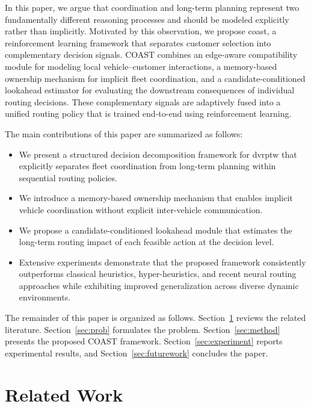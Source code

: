 \documentclass[conference]{IEEEtran}
\begin{document}
In this paper, we argue that coordination and long-term planning represent two fundamentally different reasoning processes and should be modeled explicitly rather than implicitly. Motivated by this observation, we propose \gls{coast}, a reinforcement learning framework that separates customer selection into complementary decision signals. COAST combines an edge-aware compatibility module for modeling local vehicle--customer interactions, a memory-based ownership mechanism for implicit fleet coordination, and a candidate-conditioned lookahead estimator for evaluating the downstream consequences of individual routing decisions. These complementary signals are adaptively fused into a unified routing policy that is trained end-to-end using reinforcement learning.

The main contributions of this paper are summarized as follows:

\begin{itemize}
    \item We present a structured decision decomposition framework for \gls{dvrptw} that explicitly separates fleet coordination from long-term planning within sequential routing policies.
    \item We introduce a memory-based ownership mechanism that enables implicit vehicle coordination without explicit inter-vehicle communication.
    \item We propose a candidate-conditioned lookahead module that estimates the long-term routing impact of each feasible action at the decision level.
    \item Extensive experiments demonstrate that the proposed framework consistently outperforms classical heuristics, hyper-heuristics, and recent neural routing approaches while exhibiting improved generalization across diverse dynamic environments.
\end{itemize}

The remainder of this paper is organized as follows. Section~\ref{sec:related} reviews the related literature. Section~\ref{sec:prob} formulates the problem. Section~\ref{sec:method} presents the proposed COAST framework. Section~\ref{sec:experiment} reports experimental results, and Section~\ref{sec:futurework} concludes the paper.



\section{Related Work}
\label{sec:related}
\end{document}
